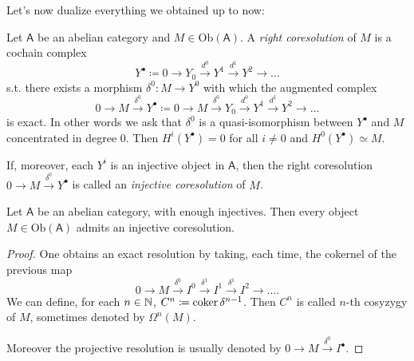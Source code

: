Let's now dualize everything we obtained up to now:
\begin{defn}
	Let $\mathsf{A}$ be an abelian category and $M \in \mathrm{Ob} \left(\mathsf{A}\right)$.
	A {\em right coresolution} of $M$ is a cochain complex
	\begin{equation}
	Y^\bullet \coloneqq 0 \to Y_0 \xrightarrow{d^0} Y^1 \xrightarrow{d^1} Y^2 \to\ldots	
	\end{equation} 
	s.t. there exists a morphism $\delta^0\colon M \to Y^0$ with which the augmented complex
	\begin{equation}
	0 \to M \xrightarrow{\delta^0} Y^\bullet \coloneqq 
	0 \to M \xrightarrow{\delta^0} Y_0 \xrightarrow{d^0} Y^1 \xrightarrow{d^1} Y^2 \to\ldots	
	\end{equation} 
	is exact.
	In other words we ask that $\delta^0$ is a quasi-isomorphism between
	$Y^\bullet$ and $M$ concentrated in degree $0$.
	Then $H^i(Y^\bullet) = 0$ for all $i \neq 0$ and $H^0(Y^\bullet) \simeq M$.

	If, moreover, each $Y^i$ is an injective object in $\mathsf{A}$,
	then the right coresolution $0 \to M \xrightarrow{\delta^0} Y^\bullet$ is called an
	{\em injective coresolution} of $M$.
\end{defn}

\begin{lem}
	Let $\mathsf{A}$ be an abelian category, with enough injectives.
	Then every object $M \in \mathrm{Ob} \left(\mathsf{A}\right)$ admits
	an injective coresolution.
\end{lem} 
\begin{proof}
	One obtains an exact resolution by taking, each time, the cokernel of the previous map
	\begin{equation}
		0 \to M \xrightarrow{\delta^0} I^0 \xrightarrow{\delta^1} I^1 \xrightarrow{\delta^1} I^2 \to \ldots
	.\end{equation} 
	We can define, for each $n \in \mathbb{N}$, $C^n \coloneqq \operatorname{coker} \delta^{n-1}$.
	Then $C^n$ is called $n$-th cosyzygy of $M$, sometimes
	denoted by $\Omega^n(M)$.

	Moreover the projective resolution is usually
	denoted by $0 \to M \xrightarrow{\delta^0} I^{\bullet}$.
\end{proof}

